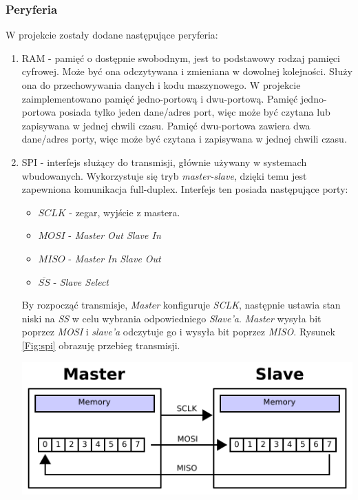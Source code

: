 \documentclass[11pt,a4paper]{article}
\begin{document}
		\subsubsection{Peryferia}
		\hspace{5mm}
			W projekcie zostały dodane następujące peryferia:
			\begin{enumerate}
			\item RAM - pamięć o dostępnie swobodnym, jest to podstawowy rodzaj pamięci cyfrowej. Może być ona odczytywana i zmieniana w dowolnej kolejności. Służy ona do przechowywania danych i kodu maszynowego. W projekcie zaimplementowano pamięć jedno-portową i dwu-portową. Pamięć jedno-portowa posiada tylko jeden dane/adres port, więc może być czytana lub zapisywana w jednej chwili czasu. Pamięć dwu-portowa zawiera dwa dane/adres porty, więc może być czytana i zapisywana w jednej chwili czasu.\cite{ram_book}
			\item SPI - interfejs służący do transmisji, głównie używany w systemach wbudowanych. Wykorzystuje się tryb \textit{master-slave}, dzięki temu jest zapewniona komunikacja full-duplex. Interfejs ten posiada następujące porty:
			\begin{itemize}
			\item $SCLK$ - zegar, wyjście z mastera.
			\item $MOSI$ - \textit{Master Out Slave In}
			\item $MISO$ - \textit{Master In Slave Out}
			\item $\overline{SS}$ - \textit{Slave Select}
			\end{itemize}
			 By rozpocząć transmisje, \textit{Master} konfiguruje \textit{SCLK}, następnie ustawia stan niski na \textit{SS} w celu wybrania odpowiedniego \textit{Slave'a}. \textit{Master} wysyła bit poprzez \textit{MOSI} i \textit{slave'a} odczytuje go i wysyła bit poprzez \textit{MISO}. Rysunek \ref{Fig:spi} obrazuję przebieg transmisji\cite{spi_book}.
			\begin{minipage}{\textwidth}
				\begin{center}
					\includegraphics[width=13cm]{./rysunki/spi.png}
				\end{center}
			\end{minipage}
			

\end{enumerate}
\end{document}
